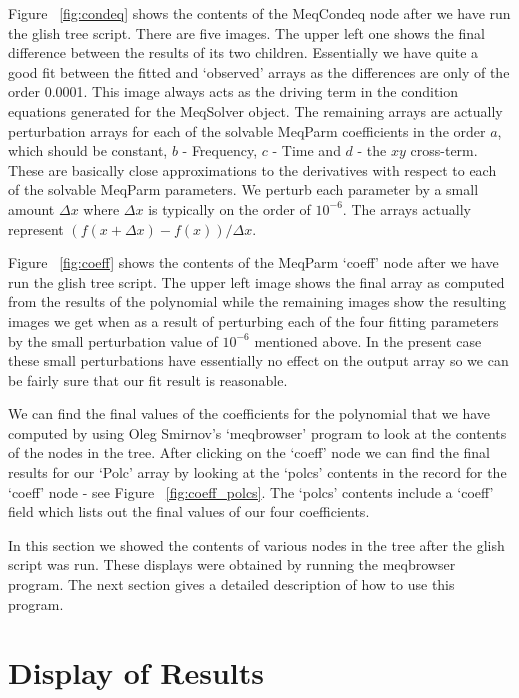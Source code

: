 \documentclass[10pt]{article}
\begin{document}
Figure ~\ref{fig:condeq} shows the contents of the MeqCondeq
node after we have run the glish tree script. There are five
images. The upper left one shows the final difference between
the results of its two children. Essentially we have quite
a good fit between the fitted and `observed' arrays 
as the differences are only of the order 0.0001. This image
always acts as the driving term in the condition equations
generated for the MeqSolver object. The remaining arrays
are actually perturbation arrays for each of the solvable
MeqParm coefficients in the order $a$, which should be constant,
$b$ - Frequency, $c$ - Time and $d$ - the $xy$ cross-term. These
are basically close approximations to the derivatives with respect to
each of the solvable MeqParm parameters. We perturb each parameter
by a small amount $\Delta x$ where $\Delta x$ is typically on
the order of $10^{-6}$.
The arrays actually represent $ (f(x+\Delta x) -f(x))/\Delta x$.

Figure ~\ref{fig:coeff} shows the contents of the MeqParm `coeff'
node after we have run the glish tree script. The upper left image
shows the final array as computed from the results of the polynomial
while the remaining images show the resulting images we get when
as a result of perturbing each of the four fitting parameters by 
the small perturbation value of $10^{-6}$ mentioned above.
In the present case these small perturbations have essentially
no effect on the output array so we can be fairly sure that our
fit result is reasonable.
 
We can find the final values of the coefficients for the polynomial
that we have computed by using Oleg Smirnov's `meqbrowser' program to look at
the contents of the nodes in the tree. After clicking on the `coeff' node
we can find the final results for our `Polc' array by looking at the 
`polcs' contents in the record for the `coeff' node - see 
Figure  ~\ref{fig:coeff_polcs}. The `polcs' contents include a `coeff' field
which lists out the final values of our four coefficients. 

In this section we showed the contents of various nodes in the 
tree after the glish script was run. These displays were obtained
by running the meqbrowser program. The next section gives a detailed
description of how to use this program.

\section{Display of Results}
\end{document}
